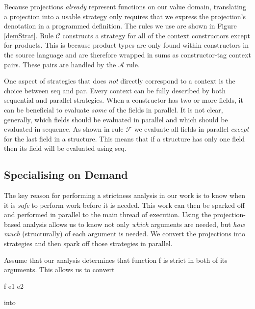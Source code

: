 Because projections \emph{already} represent functions on our value domain, translating
a projection into a usable strategy only requires that we express the projection's
denotation in a programmed definition. The rules we use are shown in Figure \ref{demStrat}.
Rule $\mathcal{C}$ constructs a strategy for all of the context constructors except for
products. This is because product types are only found within constructors in the
source language and are therefore wrapped in sums as constructor-tag context
pairs. These pairs are handled by the $\mathcal{A}$ rule.



One aspect of strategies that does \emph{not} directly correspond to a context
is the choice between \<seq\> and \<par\>. Every context can be fully
described by both sequential and parallel strategies. When a constructor has
two or more fields, it can be beneficial to evaluate \emph{some} of the fields
in parallel. It is not clear, generally, which fields should be evaluated in
parallel and which should be evaluated in sequence. As shown in rule $\mathcal{F}$
we evaluate all fields in parallel \emph{except} for the last field in a structure.
This means that if a structure has only one field then its field will be evaluated
using \<seq\>.

\subsection{Specialising on Demand}
\label{sec:specialiseDemand}

The key reason for performing a strictness analysis in our work is to know when
it is \emph{safe} to perform work before it is needed. This work can then be
sparked off and performed in parallel to the main thread of execution. Using
the projection-based analysis allows us to know not only \emph{which} arguments
are needed, but \emph{how much} (structurally) of each argument is needed. We
convert the projections into strategies and then spark off those strategies in
parallel.

Assume that our analysis determines that function \<f\> is strict in both of
its arguments.  This allows us to convert

\begin{haskell}
        f e1 e2
\end{haskell}

into

\begin{haskell}
\end{haskell}

